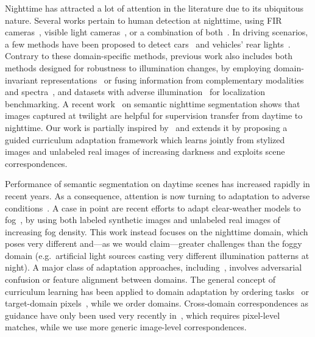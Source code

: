 \documentclass[10pt,twocolumn,letterpaper]{article}
\newcommand{\PAR}[1]{\vskip4pt \noindent{\bf #1~}}
\begin{document}
\PAR{Vision at Nighttime.}
Nighttime has attracted a lot of attention in the literature due to its ubiquitous nature. Several works pertain to human detection at nighttime, using FIR cameras~\cite{night:vision:pedestrian:05,pedestrian:detection:tracking:night:09}, visible light cameras~\cite{cnn:human:detection:nighttime:17}, or a combination of both~\cite{nighttime:pedestrian:detection:08}. In driving scenarios, a few methods have been proposed to detect cars~\cite{nighttime:object:proposal:18} and vehicles' rear lights~\cite{night:rear:lights:16}. Contrary to these domain-specific methods, previous work also includes both methods designed for robustness to illumination changes, by employing domain-invariant representations~\cite{road:detection:illumination:invariant,outdoor:transformation:labeling:iv15} or fusing information from complementary modalities and spectra~\cite{AdapNet:adverse:17}, and datasets with adverse illumination~\cite{Oxford,localization:benchmarking:adverse} for localization benchmarking.
A recent work~\cite{daytime:2:nighttime} on semantic nighttime segmentation shows that images captured at twilight are helpful for supervision transfer from daytime to nighttime. Our work is partially inspired by~\cite{daytime:2:nighttime} and extends it by proposing a guided curriculum adaptation framework which learns jointly from stylized images and unlabeled real images of increasing darkness and exploits scene correspondences.

\PAR{Domain Adaptation.}
Performance of semantic segmentation on daytime scenes has increased rapidly in recent years. As a consequence, attention is now turning to adaptation to adverse conditions~\cite{AdapNet:adverse:17,benchmark:sensor:adverse:weather:18,wulfmeier2017addressing,continuous:manifold:adaptation}. A case in point are recent efforts to adapt clear-weather models to fog~\cite{SFSU_synthetic,SynRealDataFogECCV18,CMAda:IJCV2019}, by using both labeled synthetic images and unlabeled real images of increasing fog density. This work instead focuses on the nighttime domain, which poses very different and---as we would claim---greater challenges than the foggy domain (e.g.\ artificial light sources casting very different illumination patterns at night). A major class of adaptation approaches, including~\cite{cyCADA,learning:synthetic:data:cvpr18,chen2018road,adapt:structured:output:cvpr18,incremental:adversarial:DA:18,conditional:GAN:adaptation,FCNs:adaptation,conservative:loss:adaptation,DCAN:adaptation,bidirectional:learning:adaptation}, involves adversarial confusion or feature alignment between domains.
The general concept of curriculum learning has been applied to domain adaptation by ordering tasks~\cite{curriculum:domain:adaptation:17} or target-domain pixels~\cite{self:training:adaptation}, while we order domains. Cross-domain correspondences as guidance have only been used very recently in~\cite{cross:season:correspondence}, which requires pixel-level matches, while we use more generic image-level correspondences.
\end{document}
